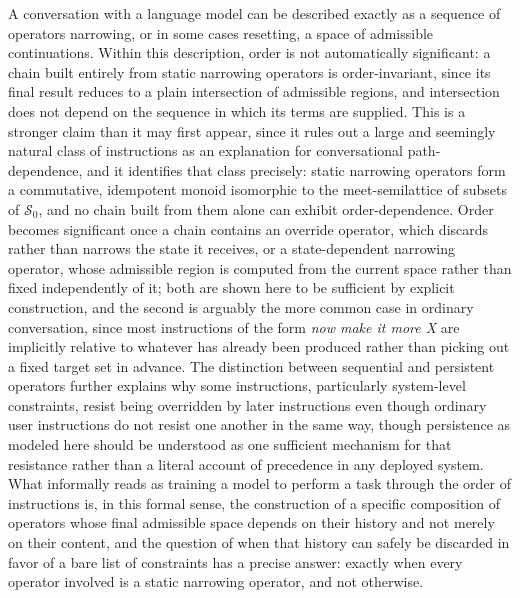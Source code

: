 \documentclass[11pt]{article}
\begin{document}
A conversation with a language model can be described exactly as a sequence of operators narrowing, or in some cases resetting, a space of admissible continuations. Within this description, order is not automatically significant: a chain built entirely from static narrowing operators is order-invariant, since its final result reduces to a plain intersection of admissible regions, and intersection does not depend on the sequence in which its terms are supplied. This is a stronger claim than it may first appear, since it rules out a large and seemingly natural class of instructions as an explanation for conversational path-dependence, and it identifies that class precisely: static narrowing operators form a commutative, idempotent monoid isomorphic to the meet-semilattice of subsets of $\mathcal{S}_0$, and no chain built from them alone can exhibit order-dependence. Order becomes significant once a chain contains an override operator, which discards rather than narrows the state it receives, or a state-dependent narrowing operator, whose admissible region is computed from the current space rather than fixed independently of it; both are shown here to be sufficient by explicit construction, and the second is arguably the more common case in ordinary conversation, since most instructions of the form \emph{now make it more X} are implicitly relative to whatever has already been produced rather than picking out a fixed target set in advance. The distinction between sequential and persistent operators further explains why some instructions, particularly system-level constraints, resist being overridden by later instructions even though ordinary user instructions do not resist one another in the same way, though persistence as modeled here should be understood as one sufficient mechanism for that resistance rather than a literal account of precedence in any deployed system. What informally reads as training a model to perform a task through the order of instructions is, in this formal sense, the construction of a specific composition of operators whose final admissible space depends on their history and not merely on their content, and the question of when that history can safely be discarded in favor of a bare list of constraints has a precise answer: exactly when every operator involved is a static narrowing operator, and not otherwise.
\end{document}
